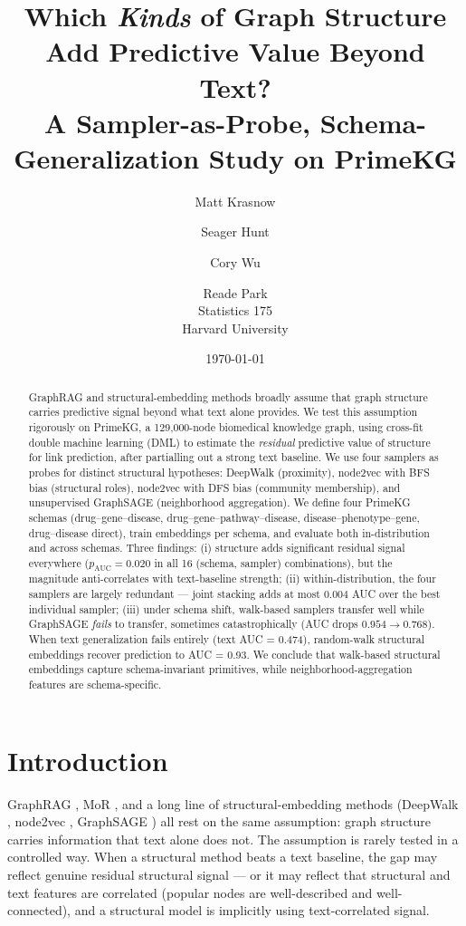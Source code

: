 \documentclass[11pt]{article}
\title{Which \textit{Kinds} of Graph Structure Add Predictive Value Beyond Text?\\
\large A Sampler-as-Probe, Schema-Generalization Study on PrimeKG}
\author{Matt Krasnow \and Seager Hunt \and Cory Wu \and Reade Park\\
Statistics 175 \\ Harvard University}
\date{\today}
\begin{document}
\maketitle

\begin{abstract}
GraphRAG and structural-embedding methods broadly assume that graph structure carries predictive signal beyond what text alone provides. We test this assumption rigorously on PrimeKG, a 129{,}000-node biomedical knowledge graph, using cross-fit double machine learning (DML) to estimate the \emph{residual} predictive value of structure for link prediction, after partialling out a strong text baseline. We use four samplers as probes for distinct structural hypotheses: DeepWalk (proximity), node2vec with BFS bias (structural roles), node2vec with DFS bias (community membership), and unsupervised GraphSAGE (neighborhood aggregation). We define four PrimeKG schemas (drug--gene--disease, drug--gene--pathway--disease, disease--phenotype--gene, drug--disease direct), train embeddings per schema, and evaluate both in-distribution and across schemas. Three findings: (i) structure adds significant residual signal everywhere ($p_{\mathrm{AUC}}=0.020$ in all 16 (schema, sampler) combinations), but the magnitude anti-correlates with text-baseline strength; (ii) within-distribution, the four samplers are largely redundant — joint stacking adds at most $0.004$ AUC over the best individual sampler; (iii) under schema shift, walk-based samplers transfer well while GraphSAGE \emph{fails} to transfer, sometimes catastrophically (AUC drops $0.954 \rightarrow 0.768$). When text generalization fails entirely (text AUC = 0.474), random-walk structural embeddings recover prediction to AUC = 0.93. We conclude that walk-based structural embeddings capture schema-invariant primitives, while neighborhood-aggregation features are schema-specific.
\end{abstract}

\section{Introduction}

GraphRAG \cite{grag2024}, MoR \cite{mor2025}, and a long line of structural-embedding methods (DeepWalk \cite{deepwalk}, node2vec \cite{node2vec}, GraphSAGE \cite{graphsage}) all rest on the same assumption: graph structure carries information that text alone does not. The assumption is rarely tested in a controlled way. When a structural method beats a text baseline, the gap may reflect genuine residual structural signal — or it may reflect that structural and text features are correlated (popular nodes are well-described and well-connected), and a structural model is implicitly using text-correlated signal.
\end{document}
